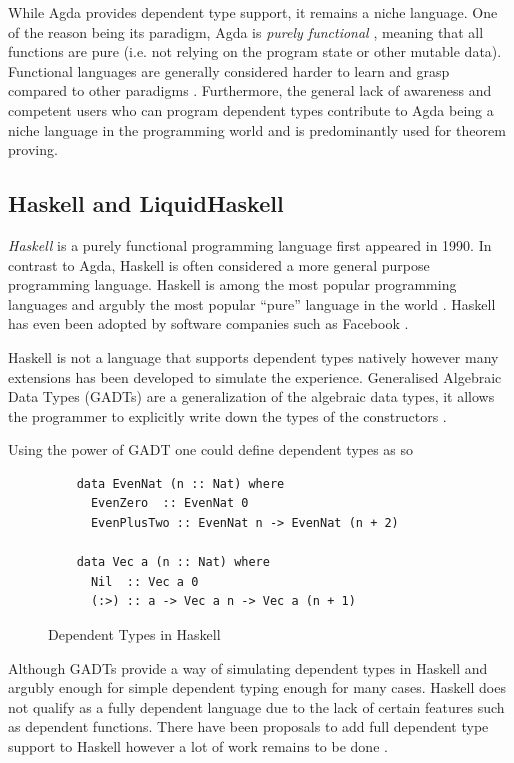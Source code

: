 \documentclass[a4paper,12pt]{report}
\begin{document}
\par
While Agda provides dependent type support, it remains a niche language. One of 
the reason being its paradigm, Agda is \textit{purely functional} \cite{purelyFP}, meaning that 
all functions are pure (i.e. not relying on the program state or other mutable 
data). Functional languages are generally considered harder to learn and grasp 
compared to other paradigms \cite{fpHarder}. Furthermore, the general lack of 
awareness and competent users who can program dependent types contribute to Agda 
being a niche language in the programming world and is 
predominantly used for theorem proving.

\subsection{Haskell and LiquidHaskell}
\textit{Haskell} \cite{haskell} is a purely functional programming language first appeared in 1990. In 
contrast to Agda, Haskell is often considered a more general purpose programming 
language. Haskell is among the most popular programming languages and argubly 
the most popular ``pure'' language in the world \cite{pypl}. 
Haskell has even been adopted by software companies such as Facebook \cite{haskellFB}.

\par
Haskell is not a language that supports dependent types natively however many 
extensions has been developed to simulate the experience. 
Generalised Algebraic Data Types (GADTs) are a generalization of the 
algebraic data types, it allows the programmer to 
explicitly write down the types of the constructors \cite{haskellGADT}. 

\par
Using the power of GADT one could define dependent types as so

\begin{figure}[H]
  \begin{lstlisting}      
    data EvenNat (n :: Nat) where
      EvenZero  :: EvenNat 0
      EvenPlusTwo :: EvenNat n -> EvenNat (n + 2)
      
    data Vec a (n :: Nat) where
      Nil  :: Vec a 0
      (:>) :: a -> Vec a n -> Vec a (n + 1)
  \end{lstlisting}
  \caption{Dependent Types in Haskell}
\end{figure}

\par
Although GADTs provide a way of simulating dependent types in Haskell and 
argubly enough for simple dependent typing enough for many cases. 
Haskell does not qualify as a fully dependent 
language due to the lack of certain features such as dependent functions. There 
have been proposals to add full dependent type support to Haskell however a lot 
of work remains to be done \cite{dependentHaskell, aRoleForDependentHaskell}. 
\end{document}
